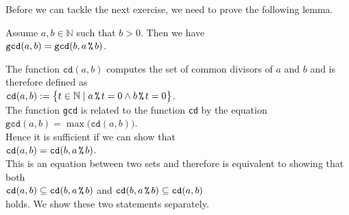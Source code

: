 Before we can tackle the next exercise, we need to prove the following lemma.
\begin{Lemma}[Euclid]
  Assume $a, b \in \mathbb{N}$ such that $b > 0$.  Then we have
  \\[0.2cm]
  \hspace*{1.3cm}
  $\mathtt{gcd}(a, b) = \mathtt{gcd}(b, a \,\texttt{\%}\, b)$.
\end{Lemma}

\proof
The function $\mathtt{cd}(a, b)$ computes the set of common divisors of $a$ and $b$ and is therefore defined as
\\[0.2cm]
\hspace*{1.3cm}
 $\mathtt{cd}(a, b) := \bigl\{ t \in \mathbb{N} \mid a \,\texttt{\%}\, t = 0 \wedge b \,\texttt{\%}\, t = 0 \bigr\}$.
 \\[0.2cm]
The function \texttt{gcd} is related to the function \texttt{cd} by the equation
\\[0.2cm]
\hspace*{1.3cm}
$\mathtt{gcd}(a, b) = \max\bigl(\mathtt{cd}(a, b)\bigr)$.
\\[0.2cm]
Hence it is sufficient if we can show that
\\[0.2cm]
\hspace*{1.3cm}
  $\mathtt{cd}(a, b) = \mathtt{cd}(b, a \,\texttt{\%}\, b)$.
\\[0.2cm]
This is an equation between two sets and therefore is equivalent to showing that both
\\[0.2cm]
\hspace*{1.3cm}
  $\mathtt{cd}(a, b) \subseteq \mathtt{cd}(b, a \,\texttt{\%}\, b)$ \quad and \quad $\mathtt{cd}(b, a \,\texttt{\%}\, b) \subseteq \mathtt{cd}(a, b)$
\\[0.2cm]
holds.  We show these two statements separately.
